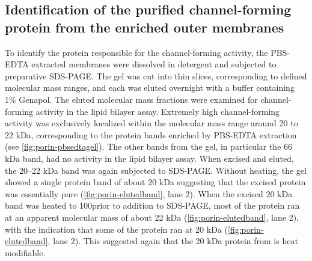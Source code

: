 \subsection{Identification of the purified channel-forming protein from the enriched outer membranes} 
To identify the protein responsible for the channel-forming activity, the
\ac{PBS}-\ac{EDTA} extracted membranes were dissolved in detergent and subjected
to preparative \ac{SDS-PAGE}. The gel was cut into thin slices, corresponding to
defined molecular mass ranges, and each was eluted overnight with a buffer
containing 1\% Genapol. The eluted molecular mass fractions were examined for
channel-forming activity in the lipid bilayer assay. Extremely high
channel-forming activity was exclusively localized within the molecular mass
range around 20 to 22 kDa, corresponding to the protein bands enriched by
\ac{PBS}-\ac{EDTA} extraction (see \cref{fig:porin-pbsedtagel}). The other bands
from the gel, in particular the 66 kDa band, had no activity in the lipid
bilayer assay. When excised and eluted, the 20--22 kDa band was again subjected to \ac{SDS-PAGE}. Without heating, the gel showed a single protein band of about 20 kDa suggesting that the excised protein was essentially pure (\cref{fig:porin-elutedband}, lane 2). When the excised 20 kDa band was heated to 100\cel prior to addition to \ac{SDS-PAGE}, most of the protein ran at an apparent molecular mass of about 22 kDa (\cref{fig:porin-elutedband}, lane 2), with the indication that some of the protein ran at 20 kDa (\cref{fig:porin-elutedband}, lane 2). This suggested again that the 20 kDa protein from \caulobacter is heat modifiable.

